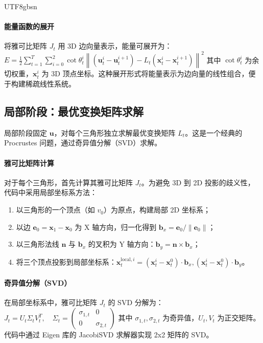 \documentclass[10pt,a4paper,twocolumn]{article}
\begin{document}
\begin{CJK*}{UTF8}{gbsn}
\paragraph{能量函数的展开}
将雅可比矩阵 $J_t$ 用 3D 边向量表示，能量可展开为：
$
E = \frac{1}{2}\sum_{t=1}^T\sum_{i=0}^2 \cot\theta_t^i \left\| (\mathbf{u}_t^i-\mathbf{u}_t^{i+1}) - L_t(\mathbf{x}_t^i-\mathbf{x}_t^{i+1}) \right\|^2
$
其中 $\cot\theta_t^i$ 为余切权重，$\mathbf{x}_t^i$ 为 3D 顶点坐标。这种展开形式将能量表示为边向量的线性组合，便于构建稀疏线性系统。

\subsection{局部阶段：最优变换矩阵求解}
局部阶段固定 $\mathbf{u}$，对每个三角形独立求解最优变换矩阵 $L_t$。这是一个经典的 Procrustes 问题，通过奇异值分解（SVD）求解。

\paragraph{雅可比矩阵计算}
对于每个三角形，首先计算其雅可比矩阵 $J_t$。为避免 3D 到 2D 投影的歧义性，代码中采用局部坐标系方法：
\begin{enumerate}
\item 以三角形的一个顶点（如 $v_0$）为原点，构建局部 2D 坐标系；
\item 以边 $\mathbf{e}_0 = \mathbf{x}_1 - \mathbf{x}_0$ 为 X 轴方向，归一化得到 $\mathbf{b}_x = \mathbf{e}_0 / \|\mathbf{e}_0\|$；
\item 以三角形法线 $\mathbf{n}$ 与 $\mathbf{b}_x$ 的叉积为 Y 轴方向：$\mathbf{b}_y = \mathbf{n} \times \mathbf{b}_x$；
\item 将三个顶点投影到局部坐标系：$\mathbf{x}_t^{\text{local},i} = (\mathbf{x}_t^i - \mathbf{x}_t^0) \cdot \mathbf{b}_x, (\mathbf{x}_t^i - \mathbf{x}_t^0) \cdot \mathbf{b}_y$。
\end{enumerate}

\paragraph{奇异值分解（SVD）}
在局部坐标系中，雅可比矩阵 $J_t$ 的 SVD 分解为：
$
J_t = U_t \Sigma_t V_t^T, \quad \Sigma_t = \begin{pmatrix}\sigma_{1,t} & 0 \\ 0 & \sigma_{2,t}\end{pmatrix}
$
其中 $\sigma_{1,t}, \sigma_{2,t}$ 为奇异值，$U_t, V_t$ 为正交矩阵。代码中通过 Eigen 库的 JacobiSVD 求解器实现 2x2 矩阵的 SVD。


\end{CJK*}
\end{document}

